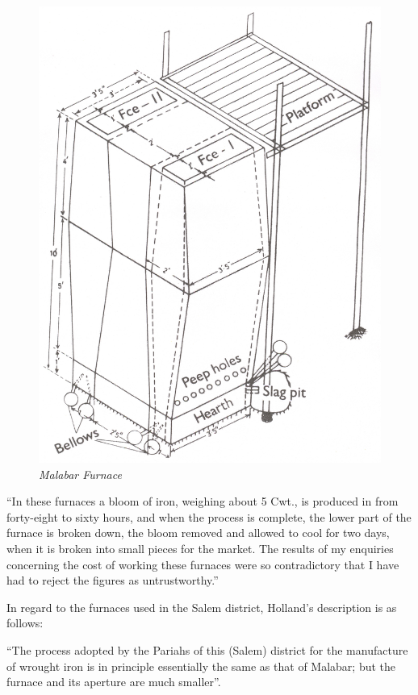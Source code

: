 \begin{figure}[H]
\setcounter{figure}{40}
\includegraphics[scale=.2]{images/chapter-6/Fig41.jpg}
\caption{\textit{Malabar Furnace}}\label{chapter-6-fig41}
\end{figure}

\vspace{-.5cm}

``In these furnaces a bloom of iron, weighing about 5 Cwt., is produced in from forty-eight to sixty hours, and when the process is complete, the lower part of the furnace is broken down, the bloom removed and allowed to cool for two days, when it is broken into small pieces for the market. The results of my enquiries concerning the cost of working these furnaces were so contradictory that I have had to reject the figures as untrustworthy.”

In regard to the furnaces used in the Salem district, Holland’s description is as follows: 

“The process adopted by the Pariahs of this (Salem) district for the manufacture of wrought iron is in principle essentially the same as that of Malabar; but the furnace and its aperture are much smaller”. 


